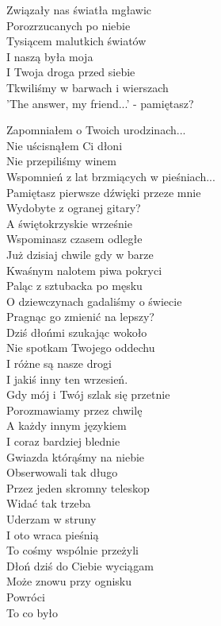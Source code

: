 
\begin{text}
    \begin{footTwelve}
    Związały nas światła mgławic\\
    Porozrzucanych po niebie\\
    Tysiącem malutkich światów\\
    I naszą była moja\\
    I Twoja droga przed siebie\\
    Tkwiliśmy w barwach i wierszach\\
    'The answer, my friend...' - pamiętasz?

    Zapomniałem o Twoich urodzinach...\\
    Nie uścisnąłem Ci dłoni\\
    Nie przepiliśmy winem\\
    Wspomnień z lat brzmiących w pieśniach...\\
    Pamiętasz pierwsze dźwięki przeze mnie\\
    Wydobyte z ogranej gitary?\\
    A świętokrzyskie wrześnie\\
    Wspominasz czasem odległe\\
    Już dzisiaj chwile gdy w barze\\
    Kwaśnym nalotem piwa pokryci\\
    Paląc z sztubacka po męsku\\
    O dziewczynach gadaliśmy o świecie\\
    Pragnąc go zmienić na lepszy?\\
    Dziś dłońmi szukając wokoło\\
    Nie spotkam Twojego oddechu\\
    I różne są nasze drogi\\
    I jakiś inny ten wrzesień.\\
    Gdy mój i Twój szlak się przetnie\\
    Porozmawiamy przez chwilę\\
    A każdy innym językiem\\
    I coraz bardziej blednie\\
    Gwiazda którąśmy na niebie\\
    Obserwowali tak długo\\
    Przez jeden skromny teleskop\\
    Widać tak trzeba\\
    Uderzam w struny\\
    I oto wraca pieśnią\\
    To cośmy wspólnie przeżyli\\
    Dłoń dziś do Ciebie wyciągam\\
    Może znowu przy ognisku\\
    Powróci\\
    To co było
\end{footTwelve}
\end{text}
\begin{chord}

\end{chord}